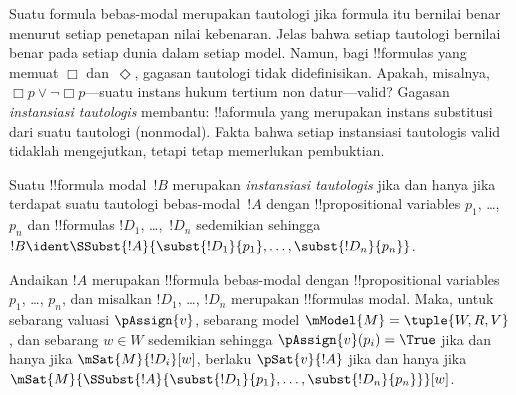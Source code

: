 \documentclass[../../../include/open-logic-section]{subfiles}
\begin{document}


\begin{explain}
Suatu formula bebas-modal merupakan tautologi jika formula itu bernilai benar
menurut setiap penetapan nilai kebenaran. Jelas bahwa setiap tautologi
bernilai benar pada setiap dunia dalam setiap model. Namun, bagi
!!{formula}s yang memuat $\Box$ dan~$\Diamond$, gagasan tautologi tidak
didefinisikan. Apakah, misalnya,
$\Box p \lor \lnot \Box p$---suatu instans hukum tertium non datur---valid?
Gagasan \emph{instansiasi tautologis} membantu: !!a{formula} yang merupakan
instans substitusi dari suatu tautologi (nonmodal). Fakta bahwa setiap
instansiasi tautologis valid tidaklah mengejutkan, tetapi tetap memerlukan
pembuktian.
\end{explain}

\begin{defn}
  Suatu !!{formula} modal~$!B$ merupakan \emph{instansiasi tautologis} jika
  dan hanya jika terdapat suatu tautologi
  bebas-modal~$!A$ dengan !!{propositional
    variable}s $p_1$, \dots,~$p_n$ dan !!{formula}s $!D_1$, \dots,~$!D_n$
  sedemikian sehingga
  $!B \ident \SSubst{!A}{\subst{!D_1}{p_1},
    \dots, \subst{!D_n}{p_n}}$.
\end{defn}

\begin{lem}
  Andaikan $!A$ merupakan !!{formula} bebas-modal dengan !!{propositional
  variable}s $p_1$, \dots, $p_n$, dan misalkan $!D_1$, \dots, $!D_n$
  merupakan !!{formula}s modal. Maka, untuk sebarang valuasi
  $\pAssign{v}$, sebarang model $\mModel{M} = \tuple{W, R, V}$, dan sebarang
  $w \in W$ sedemikian sehingga $\pAssign{v}(p_i) = \True$ jika dan hanya
  jika $\mSat{M}{!D_i}[w]$, berlaku $\pSat{v}{!A}$ jika dan hanya jika
  $\mSat{M}{\SSubst{!A}{\subst{!D_1}{p_1}, \dots,
      \subst{!D_n}{p_n}}}[w]$.
\end{lem}
\end{document}
